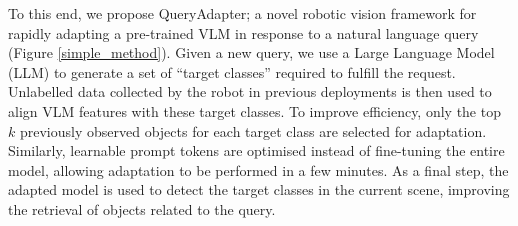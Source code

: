 
To this end, we propose QueryAdapter; a novel robotic vision framework for rapidly adapting a pre-trained VLM in response to a natural language query (Figure \ref{simple_method}). Given a new query, we use a Large Language Model (LLM) to generate a set of ``target classes'' required to fulfill the request. Unlabelled data collected by the robot in previous deployments is then used to align VLM features with these target classes. To improve efficiency, only the top $k$ previously observed objects for each target class are selected for adaptation. Similarly, learnable prompt tokens \cite{coop} are optimised instead of fine-tuning the entire model, allowing adaptation to be performed in a few minutes. 
As a final step, the adapted model is used to detect the target classes in the current scene, improving the retrieval of objects related to the query. 







